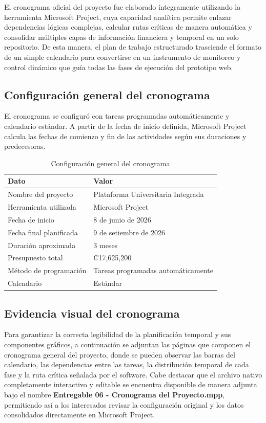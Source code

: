\documentclass[11pt,spanish]{article}
\begin{document}
El cronograma oficial del proyecto fue elaborado íntegramente utilizando la herramienta Microsoft Project, cuya capacidad analítica permite enlazar dependencias lógicas complejas, calcular rutas críticas de manera automática y consolidar múltiples capas de información financiera y temporal en un solo repositorio. De esta manera, el plan de trabajo estructurado trasciende el formato de un simple calendario para convertirse en un instrumento de monitoreo y control dinámico que guía todas las fases de ejecución del prototipo web.

\subsection{Configuración general del cronograma}

El cronograma se configuró con tareas programadas automáticamente y calendario estándar. A partir de la fecha de inicio definida, Microsoft Project calcula las fechas de comienzo y fin de las actividades según sus duraciones y predecesoras.

\begin{table}[H]
\centering
\caption{Configuración general del cronograma}
\begin{tabularx}{\textwidth}{p{5cm} Y}
\toprule
\textbf{Dato} & \textbf{Valor} \\
\midrule
Nombre del proyecto & Plataforma Universitaria Integrada \\
Herramienta utilizada & Microsoft Project \\
Fecha de inicio & 8 de junio de 2026 \\
Fecha final planificada & 9 de setiembre de 2026 \\
Duración aproximada & 3 meses \\
Presupuesto total & ₡17,625,200 \\
Método de programación & Tareas programadas automáticamente \\
Calendario & Estándar \\
\bottomrule
\end{tabularx}
\end{table}

\subsection{Evidencia visual del cronograma}

Para garantizar la correcta legibilidad de la planificación temporal y sus componentes gráficos, a continuación se adjuntan las páginas que componen el cronograma general del proyecto, donde se pueden observar las barras del calendario, las dependencias entre las tareas, la distribución temporal de cada fase y la ruta crítica señalada por el software. Cabe destacar que el archivo nativo completamente interactivo y editable se encuentra disponible de manera adjunta bajo el nombre \textbf{Entregable 06 - Cronograma del Proyecto.mpp}, permitiendo así a los interesados revisar la configuración original y los datos consolidados directamente en Microsoft Project.
\end{document}
